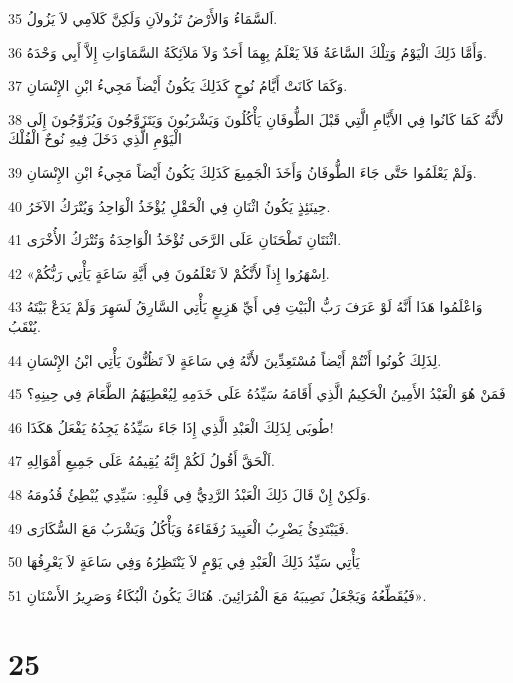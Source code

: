 \par 35 اَلسَّمَاءُ وَالأَرْضُ تَزُولاَنِ وَلَكِنَّ كَلاَمِي لاَ يَزُولُ.
\par 36 وَأَمَّا ذَلِكَ الْيَوْمُ وَتِلْكَ السَّاعَةُ فَلاَ يَعْلَمُ بِهِمَا أَحَدٌ وَلاَ مَلاَئِكَةُ السَّمَاوَاتِ إِلاَّ أَبِي وَحْدَهُ.
\par 37 وَكَمَا كَانَتْ أَيَّامُ نُوحٍ كَذَلِكَ يَكُونُ أَيْضاً مَجِيءُ ابْنِ الإِنْسَانِ.
\par 38 لأَنَّهُ كَمَا كَانُوا فِي الأَيَّامِ الَّتِي قَبْلَ الطُّوفَانِ يَأْكُلُونَ وَيَشْرَبُونَ وَيَتَزَوَّجُونَ وَيُزَوِّجُونَ إِلَى الْيَوْمِ الَّذِي دَخَلَ فِيهِ نُوحٌ الْفُلْكَ
\par 39 وَلَمْ يَعْلَمُوا حَتَّى جَاءَ الطُّوفَانُ وَأَخَذَ الْجَمِيعَ كَذَلِكَ يَكُونُ أَيْضاً مَجِيءُ ابْنِ الإِنْسَانِ.
\par 40 حِينَئِذٍ يَكُونُ اثْنَانِ فِي الْحَقْلِ يُؤْخَذُ الْوَاحِدُ وَيُتْرَكُ الآخَرُ.
\par 41 اثْنَتَانِ تَطْحَنَانِ عَلَى الرَّحَى تُؤْخَذُ الْوَاحِدَةُ وَتُتْرَكُ الأُخْرَى.
\par 42 «اِسْهَرُوا إِذاً لأَنَّكُمْ لاَ تَعْلَمُونَ فِي أَيَّةِ سَاعَةٍ يَأْتِي رَبُّكُمْ.
\par 43 وَاعْلَمُوا هَذَا أَنَّهُ لَوْ عَرَفَ رَبُّ الْبَيْتِ فِي أَيِّ هَزِيعٍ يَأْتِي السَّارِقُ لَسَهِرَ وَلَمْ يَدَعْ بَيْتَهُ يُنْقَبُ.
\par 44 لِذَلِكَ كُونُوا أَنْتُمْ أَيْضاً مُسْتَعِدِّينَ لأَنَّهُ فِي سَاعَةٍ لاَ تَظُنُّونَ يَأْتِي ابْنُ الإِنْسَانِ.
\par 45 فَمَنْ هُوَ الْعَبْدُ الأَمِينُ الْحَكِيمُ الَّذِي أَقَامَهُ سَيِّدُهُ عَلَى خَدَمِهِ لِيُعْطِيَهُمُ الطَّعَامَ فِي حِينِهِ؟
\par 46 طُوبَى لِذَلِكَ الْعَبْدِ الَّذِي إِذَا جَاءَ سَيِّدُهُ يَجِدُهُ يَفْعَلُ هَكَذَا!
\par 47 اَلْحَقَّ أَقُولُ لَكُمْ إِنَّهُ يُقِيمُهُ عَلَى جَمِيعِ أَمْوَالِهِ.
\par 48 وَلَكِنْ إِنْ قَالَ ذَلِكَ الْعَبْدُ الرَّدِيُّ فِي قَلْبِهِ: سَيِّدِي يُبْطِئُ قُدُومَهُ.
\par 49 فَيَبْتَدِئُ يَضْرِبُ الْعَبِيدَ رُفَقَاءَهُ وَيَأْكُلُ وَيَشْرَبُ مَعَ السُّكَارَى.
\par 50 يَأْتِي سَيِّدُ ذَلِكَ الْعَبْدِ فِي يَوْمٍ لاَ يَنْتَظِرُهُ وَفِي سَاعَةٍ لاَ يَعْرِفُهَا
\par 51 فَيُقَطِّعُهُ وَيَجْعَلُ نَصِيبَهُ مَعَ الْمُرَائِينَ. هُنَاكَ يَكُونُ الْبُكَاءُ وَصَرِيرُ الأَسْنَانِ».

\chapter{25}

